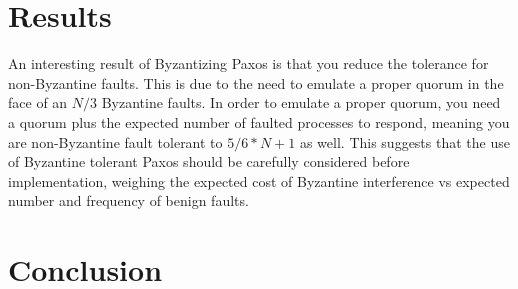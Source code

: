 \documentclass[conference]{IEEEtran}
\begin{document}
\section{Results}
An interesting result of Byzantizing Paxos is that you reduce the tolerance for non-Byzantine faults. This is due to the need to emulate a proper quorum in the face of an $N/3$ Byzantine faults. In order to emulate a proper quorum, you need a quorum plus the expected number of faulted processes to respond, meaning you are non-Byzantine fault tolerant to $5/6*N + 1$ as well. This suggests that the use of Byzantine tolerant Paxos should be carefully considered before implementation, weighing the expected cost of Byzantine interference vs expected number and frequency of benign faults.

\section{Conclusion}
\end{document}
